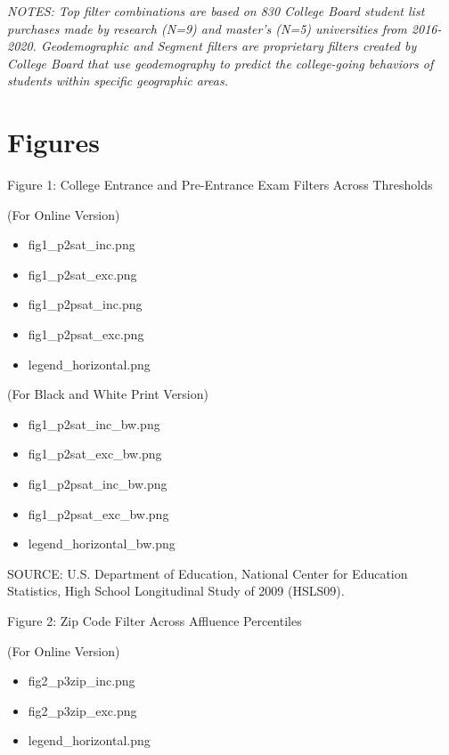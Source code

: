 \documentclass[
  12pt,
]{article}
\providecommand{\tightlist}{%
  \setlength{\itemsep}{0pt}\setlength{\parskip}{0pt}}
\begin{document}
\emph{NOTES: Top filter combinations are based on 830 College Board student list purchases made by research (N=9) and master's (N=5) universities from 2016-2020. Geodemographic and Segment filters are proprietary filters created by College Board that use geodemography to predict the college-going behaviors of students within specific geographic areas.}

\clearpage

\newpage

\hypertarget{figures}{%
\section{Figures}\label{figures}}

Figure 1: College Entrance and Pre-Entrance Exam Filters Across Thresholds

(For Online Version)

\begin{itemize}
\tightlist
\item
  fig1\_p2sat\_inc.png
\item
  fig1\_p2sat\_exc.png
\item
  fig1\_p2psat\_inc.png
\item
  fig1\_p2psat\_exc.png
\item
  legend\_horizontal.png
\end{itemize}

(For Black and White Print Version)

\begin{itemize}
\tightlist
\item
  fig1\_p2sat\_inc\_bw.png
\item
  fig1\_p2sat\_exc\_bw.png
\item
  fig1\_p2psat\_inc\_bw.png
\item
  fig1\_p2psat\_exc\_bw.png
\item
  legend\_horizontal\_bw.png
\end{itemize}

SOURCE: U.S. Department of Education, National Center for Education Statistics, High School Longitudinal Study of 2009 (HSLS09).

\newpage

Figure 2: Zip Code Filter Across Affluence Percentiles

(For Online Version)

\begin{itemize}
\tightlist
\item
  fig2\_p3zip\_inc.png
\item
  fig2\_p3zip\_exc.png
\item
  legend\_horizontal.png
\end{itemize}
\end{document}
